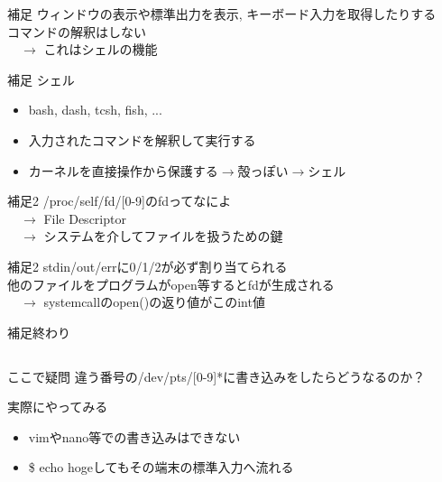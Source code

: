 \documentclass[uplatex, dvipdfmx, unicode]{beamer}
\begin{document}
\begin{frame}{補足}
  ウィンドウの表示や標準出力を表示, キーボード入力を取得したりする \\
  \alert{コマンドの解釈はしない} \\
  \ \ $\rightarrow$ これは\alert{シェル}の機能
\end{frame}

\begin{frame}{補足}
  シェル
  \begin{itemize}
    \item{bash, dash, tcsh, fish, ...}
    \item{入力されたコマンドを解釈して実行する}
    \item{カーネルを直接操作から保護する$\rightarrow$殻っぽい$\rightarrow$シェル}
  \end{itemize}
\end{frame}

\begin{frame}{補足2}
  /proc/self/fd/[0-9]のfdってなによ \\
  \ \ $\rightarrow$ File Descriptor \\
  \ \ $\rightarrow$ システムを介してファイルを扱うための鍵
\end{frame}

\begin{frame}{補足2}
  stdin/out/errに0/1/2が必ず割り当てられる \\
  他のファイルをプログラムがopen等するとfdが生成される \\
  \ \ $\rightarrow$ systemcallのopen()の返り値がこのint値
\end{frame}

\begin{frame}
  \centering
  補足終わり
\end{frame}

\subsection{}
\begin{frame}{ここで疑問}
  違う番号の/dev/pts/[0-9]*に書き込みをしたらどうなるのか？
\end{frame}

\begin{frame}{実際にやってみる}
  \begin{itemize}
    \item{vimやnano等での書き込みはできない}
    \item{\$ echo hogeしてもその端末の標準入力へ流れる}
  \end{itemize}
\end{frame}
\end{document}
